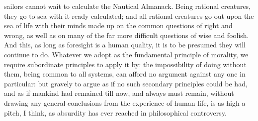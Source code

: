 \documentclass[12pt]{report}
\begin{document}
sailors cannot wait to calculate the Nautical Almanack. Being rational creatures, they go to sea with it ready calculated; and all rational creatures go out upon the sea of life with their minds made up on the common questions of right and wrong, as well as on many of the far more difficult questions of wise and foolish. And this, as long as foresight is a human quality, it is to be presumed they will continue to do. Whatever we adopt as the fundamental principle of morality, we require subordinate principles to apply it by: the impossibility of doing without them, being common to all systems, can afford no argument against any one in particular: but gravely to argue as if no such secondary principles could be had, and as if mankind had remained till now, and always must remain, without drawing any general conclusions from the experience of human life, is as high a pitch, I think, as absurdity has ever reached in philosophical controversy.
\end{document}
